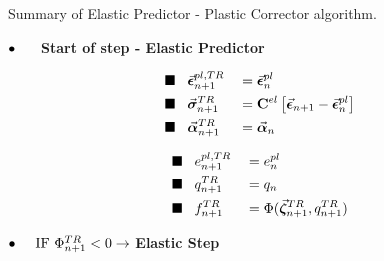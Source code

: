 {
	\centering
		\begin{Thesisbox}[label={BoxMaterial}]{Summary of Elastic Predictor - 
		Plastic Corrector algorithm.}
			

		$\bullet\hspace{0.5cm}$  \textbf{Start of step - Elastic Predictor}
		
		\vspace{-1.2cm}
		\begin{minipage}[t]{0.6\linewidth}
			\begin{alignat*}{2}
				\blacksquare\hspace{0.3cm}	&\vec{\bm{\epsilon}}^{pl,TR}_{n+1} &&= 
				\vec{\bm{\epsilon}}^{pl}_n\\
				\blacksquare\hspace{0.3cm}	&\vec{\bm{\sigma}}^{TR}_{n+1} &&=
				\mathbf{C}^{el}\left[\vec{\bm{\epsilon}}_{n+1}-\vec{\bm{\epsilon}}^{pl}_n\right]\\
				\blacksquare\hspace{0.3cm}	&\vec{\bm{\alpha}}^{TR}_{n+1} &&= 
				\vec{\bm{\alpha}}_n\\
			\end{alignat*}
		\end{minipage}
		\begin{minipage}[t]{0.22\linewidth}
			\begin{alignat*}{2}
				\blacksquare\hspace{0.3cm} &e^{pl,TR}_{n+1} &&= e^{pl}_n\\
				\blacksquare\hspace{0.3cm}	&q^{TR}_{n+1} &&= q_n\\
				\blacksquare\hspace{0.3cm}	&f_{n+1}^{TR} &&=
				\Phi(\vec{\bm{\zeta}}_{n+1}^{TR},q_{n+1}^{TR})
			\end{alignat*}
		\end{minipage}
		
		\vspace{-0.3cm}
		$\bullet\hspace{0.5cm}\text{IF}\ \Phi_{n+1}^{TR}<0\rightarrow$  
		\textbf{Elastic Step}
		

\end{Thesisbox}}
